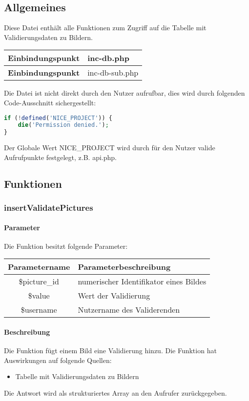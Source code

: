 \subsection{Allgemeines} Diese Datei enthält alle Funktionen zum Zugriff auf die Tabelle mit Validierungsdaten zu Bildern.
\begin{table}[H]
	\begin{tabular}{|c|p{11cm}|}
		\hline
		\textbf{Einbindungspunkt} & inc-db.php \\ \hline
		\textbf{Einbindungspunkt} & inc-db-sub.php \\ \hline
	\end{tabular}
\end{table}
Die Datei ist nicht direkt durch den Nutzer aufrufbar, dies wird durch folgenden Code-Ausschnitt sichergestellt:
\begin{lstlisting}[language=php]
if (!defined('NICE_PROJECT')) {
	die('Permission denied.');
}
\end{lstlisting}
Der Globale Wert {\glqq NICE\_PROJECT\grqq} wird durch für den Nutzer valide Aufrufpunkte festgelegt, z.B. {\glqq api.php\grqq}.
\newpage
\subsection{Funktionen}
\subsubsection{insertValidatePictures}
\paragraph{Parameter} Die Funktion besitzt folgende Parameter:
\begin{table}[H]
	\begin{tabular}{|c|p{11cm}|}
		\hline
		\textbf{Parametername} & \textbf{Parameterbeschreibung} \\ \hline
		\$picture\_id & numerischer Identifikator eines Bildes \\ \hline
		\$value       & Wert der Validierung \\ \hline
		\$username    & Nutzername des Validerenden \\ \hline
	\end{tabular}
\end{table}
\paragraph{Beschreibung} Die Funktion fügt einem Bild eine Validierung hinzu. Die Funktion hat Auswirkungen auf folgende Quellen:
\begin{itemize}
	\item Tabelle mit Validierungsdaten zu Bildern
\end{itemize}
Die Antwort wird als strukturiertes Array an den Aufrufer zurückgegeben.
